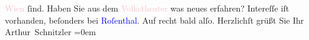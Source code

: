                         \textcolor{pink}{Wien}{}\ledrightnote{\textcolor{pink}{Wien}} ſind. Haben Sie aus dem \textcolor{pink}{Volkstheater}{}\ledrightnote{\textcolor{pink}{Volkstheater}} was neues erfahren? Intereſſe iſt vorhanden,
                    beſonders bei \textcolor{blue}{Roſenthal}{}\ledrightnote{\textcolor{blue}{Friedrich Rosenthal}}. Auf recht bald
                    alſo.\pend
           \pstart
           Herzlichſt grüßt Sie Ihr{\\[\baselineskip]}\spacefill\mbox{Arthur Schnitzler}\pend
           \leftskip=0em{}\endnumbering{}  
      